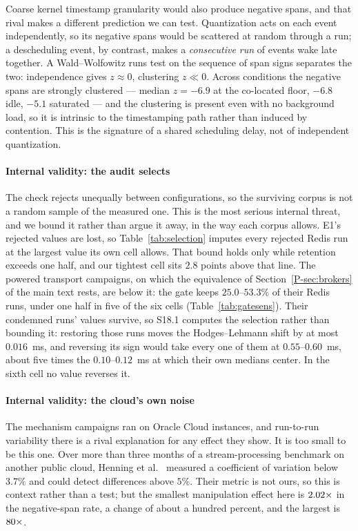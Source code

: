 \documentclass[10pt,journal,onecolumn]{IEEEtran}
\newcommand{\redis}{Redis}
\newcommand{\mainBrokers}{\ref{P-sec:brokers}}        %
\begin{document}
Coarse kernel timestamp granularity would also produce negative spans, and that rival makes a
different prediction we can test. Quantization acts on each event independently, so its negative spans
would be scattered at random through a run; a descheduling event, by contrast, makes a
\emph{consecutive run} of events wake late together. A Wald--Wolfowitz runs test on the sequence
of span signs separates the two: independence gives $z \approx 0$, clustering $z \ll 0$.
Across conditions the negative spans are strongly clustered --- median $z = -6.9$ at the co-located
floor, $-6.8$ idle, $-5.1$ saturated --- and the clustering is present even with no background
load, so it is intrinsic to the timestamping path rather than induced by contention. This is the
signature of a shared scheduling delay, not of independent quantization.

\paragraph{Internal validity: the audit selects} The check rejects unequally between configurations, so
the surviving corpus is not a random sample of the measured one. This is the most serious
internal threat, and we bound it rather than argue it away, in the way each corpus allows. E1's
rejected values are lost, so Table~\ref{tab:selection} imputes every rejected \redis{} run at
the largest value its own cell allows. That bound holds only while retention exceeds one half,
and our tightest cell sits $2.8$ points above that line. The powered transport campaigns, on
which the equivalence of Section~\mainBrokers{} of the main text rests, are below it: the gate keeps $25.0$--$53.3\%$ of their
\redis{} runs, under one half in five of the six cells (Table~\ref{tab:gatesens}). Their
condemned runs' values survive, so S18.1 computes the selection rather than bounding it:
restoring those runs moves the Hodges--Lehmann shift by at most $0.016$~ms, and reversing its
sign would take every one of them at $0.55$--$0.60$~ms, about five times the $0.10$--$0.12$~ms
at which their own medians center. In the sixth cell no value reverses it.

\paragraph{Internal validity: the cloud's own noise} The mechanism campaigns ran on Oracle
Cloud instances, and run-to-run variability there is a rival explanation for any effect they
show. It is too small to be this one. Over more than three months of a stream-processing
benchmark on another public cloud, Henning et al.~\cite{henning2025variability} measured a
coefficient of variation below $3.7\%$ and could detect differences above $5\%$. Their metric
is not ours, so this is context rather than a test; but the smallest manipulation effect here
is $2.02\times$ in the negative-span rate, a change of about a hundred percent,
and the largest is $80\times$.
\end{document}
